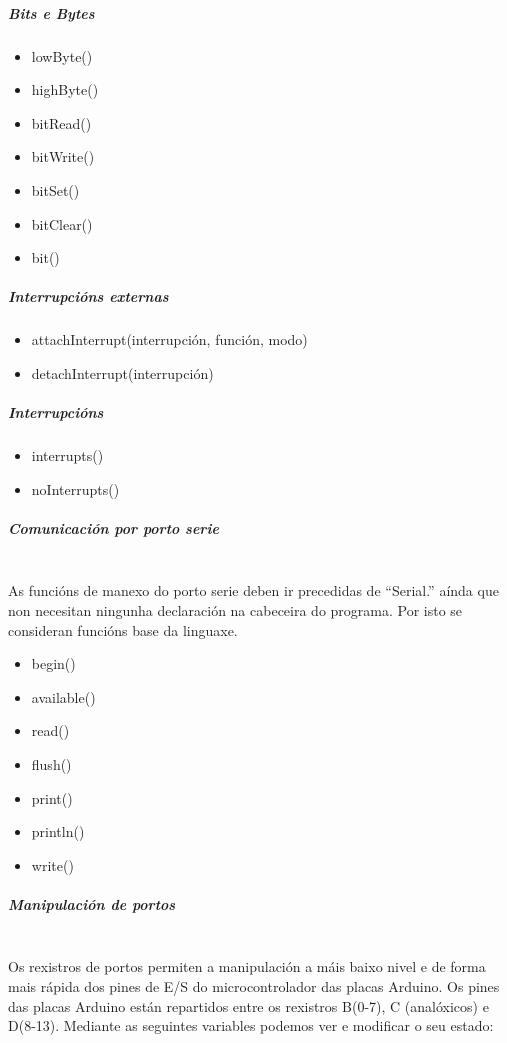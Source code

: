     \subparagraph{Bits e Bytes}

    \begin{itemize}
     \item lowByte()
     \item highByte()
     \item bitRead()
     \item bitWrite()
     \item bitSet()
     \item bitClear()
     \item bit()
    \end{itemize}

    \subparagraph{Interrupcións externas}

    \begin{itemize}
     \item attachInterrupt(interrupción, función, modo)
     \item detachInterrupt(interrupción)
    \end{itemize}

    \subparagraph{Interrupcións}

    \begin{itemize}
     \item interrupts()
     \item noInterrupts()
    \end{itemize}

    \subparagraph{Comunicación por porto serie}\mbox{}\\

    As funcións de manexo do porto serie deben ir precedidas de ``Serial.''
    aínda que non necesitan ningunha declaración na cabeceira do programa. Por
    isto se consideran funcións base da linguaxe.

    \begin{itemize}
     \item begin()
     \item available()
     \item read()
     \item flush()
     \item print()
     \item println()
     \item write()
    \end{itemize}

    \subparagraph{Manipulación de portos}\mbox{}\\

    Os rexistros de portos permiten a manipulación a máis baixo nivel e de
    forma mais rápida dos pines de E/S do microcontrolador das placas Arduino.
    Os pines das placas Arduino están repartidos entre os rexistros B(0-7),
    C (analóxicos) e D(8-13). Mediante as seguintes variables podemos ver e
    modificar o seu estado:

